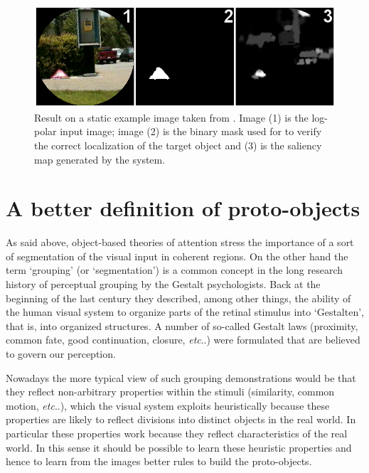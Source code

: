 \documentclass{llncs}
\makeatletter
\DeclareRobustCommand\onedot{\futurelet\@let@token\@onedot}
\def\@onedot{\ifx\@let@token.\else.\null\fi\xspace}
\def\etc{\emph{etc}\onedot} \def\vs{\emph{vs}\onedot}
\makeatother
\begin{document}
\begin{figure}[]
  \begin{center}
    \includegraphics[width=0.9\linewidth]{./figs/attention/itti}
  \end{center}
  \caption{Result on a static example image taken from \cite{IttiK01b}.
   Image (1) is the log-polar input image; image (2) is the binary mask used for to verify
   the correct localization of the target object and (3) is the saliency map generated
   by the system.}
  \label{fig:itti_ex}
\end{figure}


\section{A better definition of proto-objects\label{ass_fields}}


As said above, object-based theories of attention stress the importance
of a sort of segmentation of the visual input in coherent regions.
On the other hand the term `grouping' (or `segmentation')
is a common concept in the long research history of perceptual grouping
by the Gestalt psychologists.
Back at the beginning of the last century they
described, among other things, the ability of the human
visual system to organize parts of the retinal stimulus
into `Gestalten', that is, into organized structures.
A number of so-called Gestalt laws 
(proximity, common fate, good continuation, closure, \etc) were
formulated that are believed to govern our perception.

Nowadays the more typical view of such grouping
demonstrations would be that they reflect non-arbitrary properties within the stimuli
(similarity, common motion, \etc), which the visual system
exploits heuristically because these properties
are likely to reflect divisions into distinct objects in the real world.
In particular these properties work because they reflect characteristics of
the real world. 
In this sense it should be possible to learn these heuristic
properties and hence to learn from the images better rules
to build the proto-objects.
\end{document}
